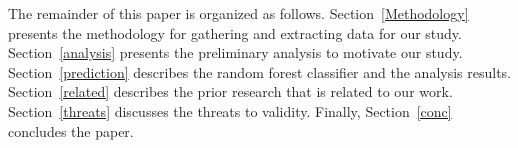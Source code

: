 

%



 
 
 
The remainder of this paper is organized as follows. Section~\ref{Methodology} presents the methodology for gathering and extracting data for our study. Section~\ref{analysis} presents the preliminary analysis to motivate our study. Section~\ref{prediction} describes the random forest classifier and the analysis results. Section~\ref{related} describes the prior research that is related to our work. Section~\ref{threats} discusses the threats to validity. Finally, Section~\ref{conc} concludes the paper.
 
 
